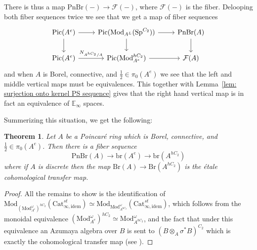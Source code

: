 \documentclass{article}
\DeclareMathOperator{\Pic}{Pic} %
\newcommand{\pnbr}{\ensuremath{\mathrm{PnBr}}}
\newtheorem{theorem}[equation]{Theorem}
\theoremstyle{definition}
\begin{document}
	There is thus a map $\pnbr(-)\to \mathcal{F}(-)$, where $\mathcal{F}(-)$ is the fiber. Delooping both fiber sequences twice we see that we get a map of fiber sequences \[
	\begin{tikzcd}
		\Pic(A^e)\ar[r] \ar[d] & \Pic(\mathrm{Mod}_{A^L}(\mathrm{Sp}^{C_2})) \ar[r] \ar[d] & \pnbr(A) \ar[d]\\
		\Pic(A^e)\ar[r,"N_{A^{hC_2}/A}"] &\Pic(\mathrm{Mod}_{A^e}^{hC_2}) \ar[r] & \mathcal{F}(A) 
	\end{tikzcd}
	\]
	and when $A$ is Borel, connective, and $\frac{1}{2}\in \pi_0(A^e)$ we see that the left and middle vertical maps must be equivalences. This together with Lemma~\ref{lem: surjection onto kernel PS sequence} gives that the right hand vertical map is in fact an equivalence of $\mathbb{E}_\infty$ spaces.

    Summerizing this situation, we get the following:
    \begin{theorem}
        Let $A$ be a Poincar{\'e} ring which is Borel, connective, and $\frac{1}{2}\in \pi_0(A^e)$. Then there is a fiber sequence \[\pnbr(A)\to \mathrm{br}(A^e)\to \mathrm{br}(A^{hC_2})\] where if $A$ is discrete then the map $\mathrm{Br}(A)\to \mathrm{Br}(A^{hC_2})$ is the {\'e}tale cohomological transfer map.
    \end{theorem}
    \begin{proof}
        All the remains to show is the identification of $\mathrm{Mod}_{(\mathrm{Mod}_{A^e}^\omega)^{hC_2}}(\mathrm{Cat}^{st}_{\infty,\textrm{idem}})\simeq \mathrm{Mod}_{\mathrm{Mod}_{A^{hC_2}}^\omega}(\mathrm{Cat}^{st}_{\infty,\textrm{idem}})$, which follows from the monoidal equivalence $(\mathrm{Mod}_{A^e}^{\omega})^{hC_2}\simeq \mathrm{Mod}_{A^{hC_2}}^\omega$, and the fact that under this equivalence an Azumaya algebra over $B$ is sent to $(B\otimes_A\sigma^*B)^{C_2}$ which is exactly the cohomological transfer map (see \cite[Example 6.2.3]{azumaya_involution}).
    \end{proof}
\end{document}
